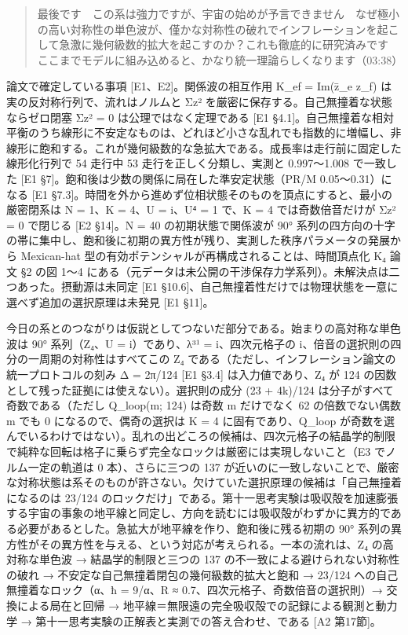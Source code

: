 \documentclass[
  a4paper,
]{ltjsarticle}
\begin{document}
\begin{quote}
最後です　この系は強力ですが、宇宙の始めが予言できません　なぜ極小の高い対称性の単色波が、僅かな対称性の破れでインフレーションを起こして急激に幾何級数的拡大を起こすのか？これも徹底的に研究済みです　ここまでモデルに組み込めると、かなり統一理論らしくなります（03:38）
\end{quote}

論文で確定している事項 {[}E1、E2{]}。関係波の相互作用 K\_ef = Im(z̄\_e
z\_f) は実の反対称行列で、流れはノルムと Σz²
を厳密に保存する。自己無撞着な状態ならゼロ閉塞 Σz² = 0
は公理ではなく定理である {[}E1
§4.1{]}。自己無撞着な相対平衡のうち線形に不安定なものは、どれほど小さな乱れでも指数的に増幅し、非線形に飽和する。これが幾何級数的な急拡大である。成長率は走行前に固定した線形化行列で
54 走行中 53 走行を正しく分類し、実測と 0.997〜1.008 で一致した {[}E1
§7{]}。飽和後は少数の関係に局在した準安定状態（PR/M 0.05〜0.31）になる
{[}E1
§7.3{]}。時間を外から進めず位相状態そのものを頂点にすると、最小の厳密閉系は
N = 1、K = 4、U = i、U⁴ = 1 で、K = 4 では奇数倍音だけが Σz² = 0
で閉じる {[}E2 §14{]}。N = 40 の初期状態で関係波が 90°
系列の四方向の十字の帯に集中し、飽和後に初期の異方性が残り、実測した秩序パラメータの発展から
Mexican-hat 型の有効ポテンシャルが再構成されることは、時間頂点化 K₄ 論文
§2 の図 1〜4
にある（元データは未公開の干渉保存力学系列）。未解決点は二つあった。摂動源は未同定
{[}E1
§10.6{]}、自己無撞着性だけでは物理状態を一意に選べず追加の選択原理は未発見
{[}E1 §11{]}。

今日の系とのつながりは仮説としてつないだ部分である。始まりの高対称な単色波は
90° 系列（Z₄、U = i）であり、λ³¹ = i、四次元格子の
i、倍音の選択則の四分の一周期の対称性はすべてこの Z₄
である（ただし、インフレーション論文の統一プロトコルの刻み Δ = 2π/124
{[}E1 §3.4{]} は入力値であり、Z₄ が 124
の因数として残った証拠には使えない）。選択則の成分 (23 + 4k)/124
は分子がすべて奇数である（ただし Q\_loop(m; 124) は奇数 m だけでなく 62
の倍数でない偶数 m でも 0 になるので、偶奇の選択は K = 4
に固有であり、Q\_loop
が奇数を選んでいるわけではない）。乱れの出どころの候補は、四次元格子の結晶学的制限で純粋な回転は格子に乗らず完全なロックは厳密には実現しないこと（E3
でノルム一定の軌道は 0 本）、さらに三つの 137
が近いのに一致しないことで、厳密な対称状態は系そのものが許さない。欠けていた選択原理の候補は「自己無撞着になるのは
23/124
のロックだけ」である。第十一思考実験は吸収殻を加速膨張する宇宙の事象の地平線と同定し、方向を読むには吸収殻がわずかに異方的である必要があるとした。急拡大が地平線を作り、飽和後に残る初期の
90°
系列の異方性がその異方性を与える、という対応が考えられる。一本の流れは、Z₄
の高対称な単色波 → 結晶学的制限と三つの 137
の不一致による避けられない対称性の破れ →
不安定な自己無撞着閉包の幾何級数的拡大と飽和 → 23/124
への自己無撞着なロック（α、ħ = 9/α、R ≈
0.7、四次元格子、奇数倍音の選択則）→ 交換による局在と回帰 →
地平線＝無限遠の完全吸収殻での記録による観測と動力学 →
第十一思考実験の正解表と実測での答え合わせ、である {[}A2 第17節{]}。
\end{document}
